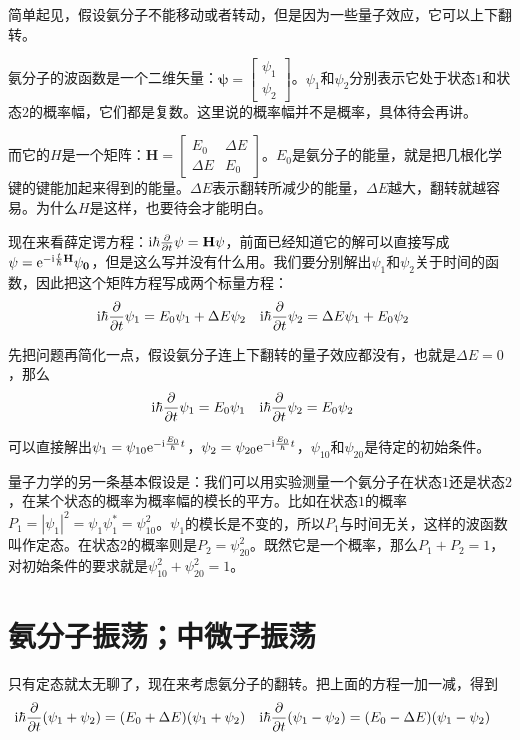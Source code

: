 简单起见，假设氨分子不能移动或者转动，但是因为一些量子效应，它可以上下翻转。

氨分子的波函数是一个二维矢量：$\mathbf{\psi}=\begin{bmatrix} \psi_1 \\ \psi_2 \end{bmatrix}$。$\psi_1$和$\psi_2$分别表示它处于状态$1$和状态$2$的概率幅，它们都是复数。这里说的概率幅并不是概率，具体待会再讲。

而它的$H$是一个矩阵：$\mathbf{H}=\begin{bmatrix} E_0 & \Delta E \\ \Delta E & E_0 \end{bmatrix}$。$E_0$是氨分子的能量，就是把几根化学键的键能加起来得到的能量。$\Delta E$表示翻转所减少的能量，$\Delta E$越大，翻转就越容易。为什么$H$是这样，也要待会才能明白。

现在来看薛定谔方程：$\mathrm{i} \hbar \frac{\partial}{\partial t} \mathbf{\psi}=\mathbf{H} \psi$，前面已经知道它的解可以直接写成$\mathbf{\psi}=\mathrm{e}^{-\mathrm{i} \frac{t}{\hbar} \mathbf{H}} \mathbf{\psi_0}$，但是这么写并没有什么用。我们要分别解出$\psi_1$和$\psi_2$关于时间的函数，因此把这个矩阵方程写成两个标量方程：
\begin{align*}
\mathrm{i} \hbar \frac{\partial}{\partial t} \psi_1&=E_0 \psi_1+\Delta E \psi_2 & \mathrm{i} \hbar \frac{\partial}{\partial t} \psi_2&=\Delta E \psi_1+E_0 \psi_2
\end{align*}

先把问题再简化一点，假设氨分子连上下翻转的量子效应都没有，也就是$\Delta E=0$，那么
\begin{align*}
\mathrm{i} \hbar \frac{\partial}{\partial t} \psi_1&=E_0 \psi_1 & \mathrm{i} \hbar \frac{\partial}{\partial t} \psi_2&=E_0 \psi_2
\end{align*}

可以直接解出$\psi_1=\psi_{1 0} \mathrm{e}^{-\mathrm{i} \frac{E_0}{\hbar} t}$，$\psi_2=\psi_{2 0} \mathrm{e}^{-\mathrm{i} \frac{E_0}{\hbar} t}$，$\psi_{1 0}$和$\psi_{2 0}$是待定的初始条件。

量子力学的另一条基本假设是：我们可以用实验测量一个氨分子在状态$1$还是状态$2$，在某个状态的概率为概率幅的模长的平方。比如在状态$1$的概率$P_1=|\psi_1|^2=\psi_1 \psi_1^*=\psi_{1 0}^2$。$\psi_1$的模长是不变的，所以$P_1$与时间无关，这样的波函数叫作定态。在状态$2$的概率则是$P_2=\psi_{2 0}^2$。既然它是一个概率，那么$P_1+P_2=1$，对初始条件的要求就是$\psi_{1 0}^2+\psi_{2 0}^2=1$。
\section{氨分子振荡；中微子振荡}
只有定态就太无聊了，现在来考虑氨分子的翻转。把上面的方程一加一减，得到
\begin{align*}
\mathrm{i} \hbar \frac{\partial}{\partial t} (\psi_1+\psi_2)&=(E_0+\Delta E)(\psi_1+\psi_2) & \mathrm{i} \hbar \frac{\partial}{\partial t} (\psi_1-\psi_2)&=(E_0-\Delta E)(\psi_1-\psi_2)
\end{align*}

